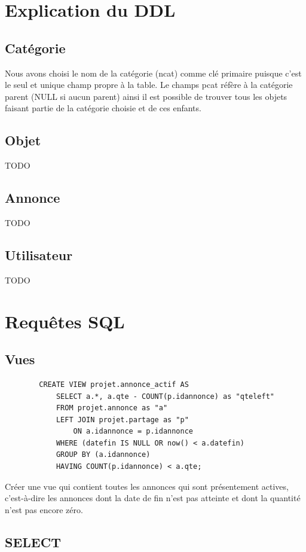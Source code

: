 \documentclass[a4paper,12pt]{article}
\begin{document}
\begin{spacing}{1}
	\section*{Explication du DDL}
	\subsection*{Catégorie}
	Nous avons choisi le nom de la catégorie (ncat) comme clé primaire puisque c'est le seul et unique champ propre à la table. Le champs pcat réfère à la catégorie parent (NULL si aucun parent) ainsi il est possible de trouver tous les objets faisant partie de la catégorie choisie et de ces enfants.
	\subsection*{Objet}
	TODO
	\subsection*{Annonce}
	TODO
	\subsection*{Utilisateur}
	TODO
	\section*{Requêtes SQL}
	\subsection*{Vues}
	
	\begin{verbatim}
	    CREATE VIEW projet.annonce_actif AS
            SELECT a.*, a.qte - COUNT(p.idannonce) as "qteleft"
            FROM projet.annonce as "a"
            LEFT JOIN projet.partage as "p" 
                ON a.idannonce = p.idannonce
            WHERE (datefin IS NULL OR now() < a.datefin)
            GROUP BY (a.idannonce)
            HAVING COUNT(p.idannonce) < a.qte;

	\end{verbatim}
	Créer une vue qui contient toutes les annonces qui sont présentement actives, c'est-à-dire les annonces dont la date de fin n'est pas atteinte et dont la quantité n'est pas encore zéro.
	
	\subsection*{SELECT}
	

\end{spacing}
\end{document}
